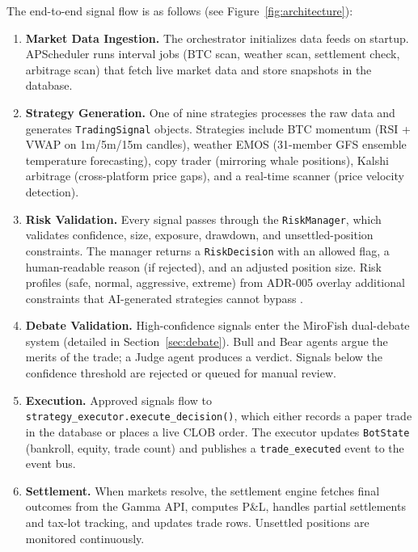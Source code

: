 The end-to-end signal flow is as follows (see Figure~\ref{fig:architecture}):

\begin{enumerate}
    \item \textbf{Market Data Ingestion.} The orchestrator initializes data feeds on startup. APScheduler runs interval jobs (BTC scan, weather scan, settlement check, arbitrage scan) that fetch live market data and store snapshots in the database.
    
    \item \textbf{Strategy Generation.} One of nine strategies processes the raw data and generates \texttt{TradingSignal} objects. Strategies include BTC momentum (RSI + VWAP on 1m/5m/15m candles), weather EMOS (31-member GFS ensemble temperature forecasting), copy trader (mirroring whale positions), Kalshi arbitrage (cross-platform price gaps), and a real-time scanner (price velocity detection).
    
    \item \textbf{Risk Validation.} Every signal passes through the \texttt{RiskManager}, which validates confidence, size, exposure, drawdown, and unsettled-position constraints. The manager returns a \texttt{RiskDecision} with an allowed flag, a human-readable reason (if rejected), and an adjusted position size. Risk profiles (safe, normal, aggressive, extreme) from ADR-005 overlay additional constraints that AI-generated strategies cannot bypass \citep{nygard2018release}.
    
    \item \textbf{Debate Validation.} High-confidence signals enter the MiroFish dual-debate system (detailed in Section~\ref{sec:debate}). Bull and Bear agents argue the merits of the trade; a Judge agent produces a verdict. Signals below the confidence threshold are rejected or queued for manual review.
    
    \item \textbf{Execution.} Approved signals flow to \texttt{strategy\_executor.execute\_decision()}, which either records a paper trade in the database or places a live CLOB order. The executor updates \texttt{BotState} (bankroll, equity, trade count) and publishes a \texttt{trade\_executed} event to the event bus.
    
    \item \textbf{Settlement.} When markets resolve, the settlement engine fetches final outcomes from the Gamma API, computes P\&L, handles partial settlements and tax-lot tracking, and updates trade rows. Unsettled positions are monitored continuously.
\end{enumerate}

